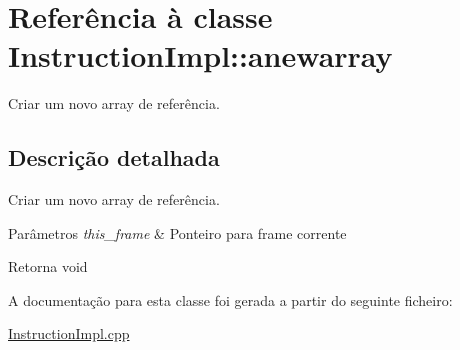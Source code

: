 \hypertarget{class_instruction_impl_1_1anewarray}{}\section{Referência à classe Instruction\+Impl\+:\+:anewarray}
\label{class_instruction_impl_1_1anewarray}


Criar um novo array de referência.  




\subsection{Descrição detalhada}
Criar um novo array de referência. 


\begin{DoxyParams}{Parâmetros}
{\em this\+\_\+frame} & Ponteiro para frame corrente \\
\hline
\end{DoxyParams}
\begin{DoxyReturn}{Retorna}
void 
\end{DoxyReturn}


A documentação para esta classe foi gerada a partir do seguinte ficheiro\+:\begin{DoxyCompactItemize}
\item 
\hyperlink{_instruction_impl_8cpp}{Instruction\+Impl.\+cpp}\end{DoxyCompactItemize}

